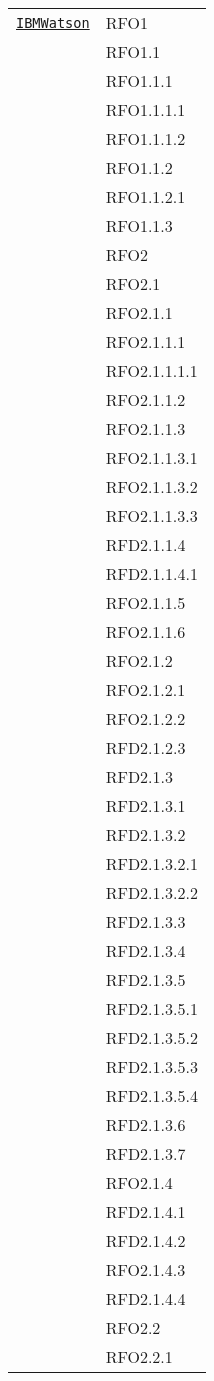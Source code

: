 \begin{longtable}{|>{\centering}m{10cm}|m{3cm}<{\centering}|}
\hyperref[IBMWatson]{\texttt{IBMWatson}} & RFO1\\
& RFO1.1\\
& RFO1.1.1\\
& RFO1.1.1.1\\
& RFO1.1.1.2\\
& RFO1.1.2\\
& RFO1.1.2.1\\
& RFO1.1.3\\
& RFO2\\
& RFO2.1\\
& RFO2.1.1\\
& RFO2.1.1.1\\
& RFO2.1.1.1.1\\
& RFO2.1.1.2\\
& RFO2.1.1.3\\
& RFO2.1.1.3.1\\
& RFO2.1.1.3.2\\
& RFO2.1.1.3.3\\
& RFD2.1.1.4\\
& RFD2.1.1.4.1\\
& RFO2.1.1.5\\
& RFO2.1.1.6\\
& RFO2.1.2\\
& RFO2.1.2.1\\
& RFO2.1.2.2\\
& RFD2.1.2.3\\
& RFD2.1.3\\
& RFD2.1.3.1\\
& RFD2.1.3.2\\
& RFD2.1.3.2.1\\
& RFD2.1.3.2.2\\
& RFD2.1.3.3\\
& RFD2.1.3.4\\
& RFD2.1.3.5\\
& RFD2.1.3.5.1\\
& RFD2.1.3.5.2\\
& RFD2.1.3.5.3\\
& RFD2.1.3.5.4\\
& RFD2.1.3.6\\
& RFD2.1.3.7\\
& RFO2.1.4\\
& RFD2.1.4.1\\
& RFD2.1.4.2\\
& RFO2.1.4.3\\
& RFD2.1.4.4\\
& RFO2.2\\
& RFO2.2.1\\

\end{longtable}
